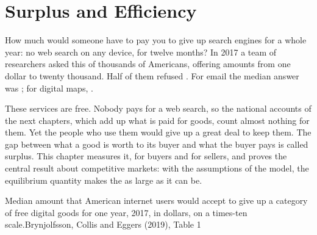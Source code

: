 \chapter{Surplus and Efficiency}\label{ch:g10:surplus-and-efficiency}

How much would someone have to pay you to give up search engines for a whole year: no web search on any device, for
twelve months? In 2017 a team of researchers asked this of thousands of Americans, offering amounts from one dollar to
twenty thousand. Half of them refused . For email the median answer was ; for digital maps, .

These services are free. Nobody pays for a web search, so the national accounts of the next chapters, which add up what is
paid for goods, count almost nothing for them. Yet the people who use them would give up a great deal to keep them. The gap
between what a good is worth to its buyer and what the buyer pays is called surplus. This chapter measures it, for buyers and
for sellers, and proves the central result about competitive markets: with the assumptions of the model, the equilibrium
quantity makes the  as large as it can be.

\begin{openingchart}{Median amount that American internet users would accept to give up a category of free digital goods for one
year, 2017, in dollars, on a times-ten scale.}{Brynjolfsson, Collis and Eggers (2019), Table 1}
\end{openingchart}

